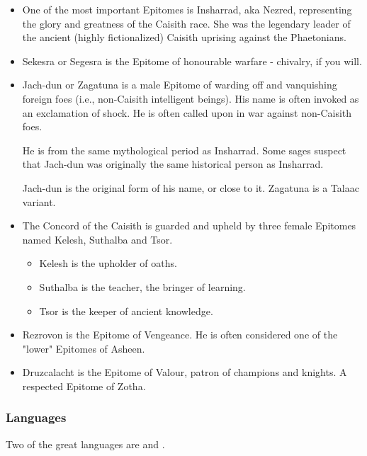 \begin{itemize}
    \item 
        One of the most important Epitomes is Insharrad, aka Nezred, representing the glory and greatness of the Caisith race. She was the legendary leader of the ancient (highly fictionalized) Caisith uprising against the Phaetonians. 
    \item Sekesra or Segesra is the Epitome of honourable warfare - chivalry, if you will. 
    \item
        Jach-dun or Zagatuna is a male Epitome of warding off and vanquishing foreign foes (i.e., non-Caisith intelligent beings). His name is often invoked as an exclamation of shock. He is often called upon in war against non-Caisith foes.
        
        He is from the same mythological period as Insharrad. Some sages suspect that Jach-dun was originally the same historical person as Insharrad.
        
        Jach-dun is the original  form of his name, or close to it. Zagatuna is a Talaac variant. 

    \item 
        The Concord of the Caisith is guarded and upheld by three female Epitomes named Kelesh, Suthalba and Tsor. 
        \begin{itemize}
            \item Kelesh is the upholder of oaths. 
            \item Suthalba is the teacher, the bringer of learning. 
            \item Tsor is the keeper of ancient knowledge. 
        \end{itemize}
    
    \item 
        Rezrovon is the Epitome of Vengeance. He is often considered one of the "lower" Epitomes of Asheen. 

    \item 
        Druzcalacht is the Epitome of Valour, patron of champions and knights. A respected Epitome of Zotha. 

\end{itemize}






\subsubsection{Languages}
Two of the great \caisith languages are  and . 





